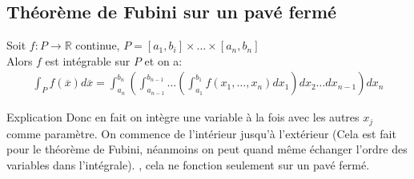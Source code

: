 \subsection{Théorème de Fubini sur un pavé fermé}
\begin{theoreme}
    Soit $f: P \to \mathbb{R}$ continue, $P =  \left[a_1, b_i\right] \times \ldots \times \left[a_n, b_n\right]$\\
    Alors $f$ est intégrable sur $P$ et on a:
    \begin{align*} \int_P f\left(\overline{x}\right)d\overline{x} = \int_{a_n}^{b_n}\left(\int_{a_{n-1}}^{b_{n-1}}\ldots \left(\int_{a_1}^{b_1} f\left(x_1, \ldots, x_n\right)dx_1\right)dx_2\ldots dx_{n-1}\right)dx_n \end{align*}
\end{theoreme}
\begin{parag}{Explication}
    Donc en fait on intègre une variable à la fois avec les autres $x_j$ comme paramètre.  On commence de l'intérieur  jusqu'à l'extérieur (Cela est fait pour le théorème de Fubini, néanmoins on peut quand même échanger l'ordre des variables dans l'intégrale). ,  cela ne fonction seulement sur un pavé fermé.\\

\end{parag}








